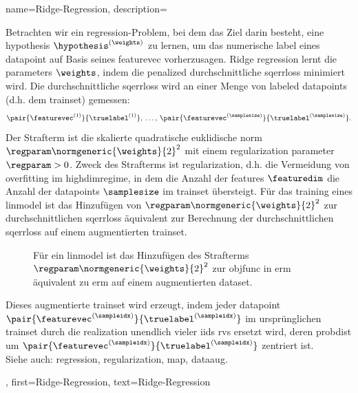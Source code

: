 {{{{
{name={Ridge-Regression}, 
	description={Betrachten wir ein \gls{regression}-Problem, bei dem das Ziel darin besteht, eine \gls{hypothesis} $\hypothesis^{(\weights)}$ zu lernen, 
		um das numerische \gls{label} eines \gls{datapoint} auf Basis seines \gls{featurevec} vorherzusagen. 
		Ridge \gls{regression} lernt die \glspl{parameter} $\weights$, 
		indem die penalized durchschnittliche \gls{sqerrloss} minimiert wird. Die durchschnittliche \gls{sqerrloss} wird 
		an einer Menge von \glspl{labeled datapoint} (d.h. dem \gls{trainset}) gemessen:
		$$\pair{\featurevec^{(1)}}{\truelabel^{(1)}}, \,\ldots, \,\pair{\featurevec^{(\samplesize)}}{\truelabel^{(\samplesize)}}.$$ 
		Der Strafterm ist die skalierte quadratische euklidische \gls{norm} $\regparam \normgeneric{\weights}{2}^{2}$ mit einem 
		\gls{regularization} \gls{parameter} $\regparam > 0$. Zweck des Strafterms ist \gls{regularization}, 
		d.h. die Vermeidung von \gls{overfitting} im \gls{highdimregime}, in dem die Anzahl der \glspl{feature} 
		$\featuredim$ die Anzahl der \glspl{datapoint} $\samplesize$ im \gls{trainset} übersteigt. 
		Für das \gls{training} eines \gls{linmodel} ist das Hinzufügen von $\regparam \normgeneric{\weights}{2}^{2}$ zur durchschnittlichen 
		\gls{sqerrloss} äquivalent zur Berechnung der durchschnittlichen \gls{sqerrloss} auf einem augmentierten \gls{trainset}. 
		\begin{figure}[H]
			\begin{center} 
				\begin{tikzpicture}[scale = 1]
				\end{tikzpicture}
				\caption{Für ein \gls{linmodel} ist das Hinzufügen des Strafterms $\regparam \normgeneric{\weights}{2}^2$ zur 
				\gls{objfunc} in \gls{erm} äquivalent zu \gls{erm} auf einem augmentierten \gls{dataset}. \label{fig_ridge_regression_dict} }
			\end{center}
		\end{figure} 
		Dieses augmentierte \gls{trainset} wird erzeugt, indem jeder \gls{datapoint} 
		$\pair{\featurevec^{(\sampleidx)}}{\truelabel^{(\sampleidx)}}$ 
		im ursprünglichen \gls{trainset} durch die \gls{realization} unendlich vieler 
		\glspl{iid} \glspl{rv} ersetzt wird, deren \gls{probdist} um 
		$\pair{\featurevec^{(\sampleidx)}}{\truelabel^{(\sampleidx)}}$ zentriert ist.
		\\
		Siehe auch: \gls{regression}, \gls{regularization}, \gls{map}, \gls{dataaug}.},
	first={Ridge-Regression},
	text={Ridge-Regression}
}

}}}}
